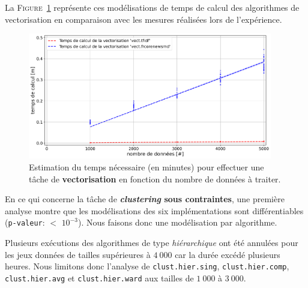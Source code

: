 			La \textsc{Figure~\ref{figure:4.3.2-ETUDE-COUTS-TEMPS-CALCUL-MODELISATION-VECTORIZATION}} représente ces modélisations de temps de calcul des algorithmes de vectorisation en comparaison avec les mesures réalisées lors de l'expérience.
			\newline
			\begin{figure}[!htb]
				\centering
				\includegraphics[width=0.95\textwidth]{figures/etude-temps-calcul-modelisation-2vect}
				\caption{
					Estimation du temps nécessaire (en minutes) pour effectuer une tâche de \textbf{vectorisation} en fonction du nombre de données à traiter.
				}
				\label{figure:4.3.2-ETUDE-COUTS-TEMPS-CALCUL-MODELISATION-VECTORIZATION}
			\end{figure}
			
			
			En ce qui concerne la tâche de \textbf{\textit{clustering} sous contraintes}, une première analyse montre que les modélisations des six implémentations sont différentiables (\texttt{p-valeur}: $<$ \texttt{$10^{-3}$}). Nous faisons donc une modélisation par algorithme.
			
			\begin{leftBarWarning}
				Plusieurs exécutions des algorithmes de type \textit{hiérarchique} ont été annulées pour les jeux données de tailles supérieures à $4~000$ car la durée excédé plusieurs heures.
				Nous limitons donc l'analyse de \texttt{clust.hier.sing}, \texttt{clust.hier.comp}, \texttt{clust.hier.avg} et \texttt{clust.hier.ward} aux tailles de $1~000$ à $3~000$.
			\end{leftBarWarning}
			
